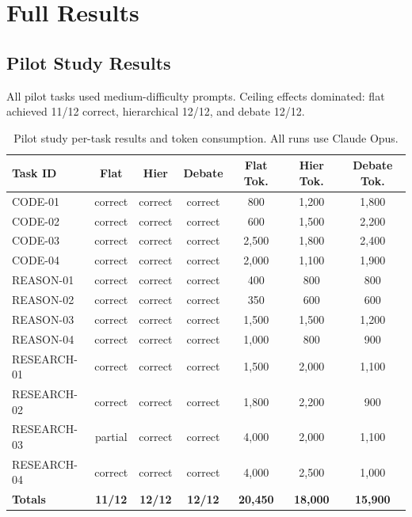 \section{Full Results}
\label{app:results}

\subsection{Pilot Study Results}

All pilot tasks used medium-difficulty prompts. Ceiling effects dominated: flat achieved 11/12 correct, hierarchical 12/12, and debate 12/12.

\begin{table}[h]
\centering
\caption{Pilot study per-task results and token consumption. All runs use Claude Opus.}
\label{tab:pilot_results}
\scriptsize
\begin{tabular}{lcccccc}
\toprule
\textbf{Task ID} & \textbf{Flat} & \textbf{Hier} & \textbf{Debate} & \textbf{Flat Tok.} & \textbf{Hier Tok.} & \textbf{Debate Tok.} \\
\midrule
CODE-01 & correct & correct & correct & 800 & 1,200 & 1,800 \\
CODE-02 & correct & correct & correct & 600 & 1,500 & 2,200 \\
CODE-03 & correct & correct & correct & 2,500 & 1,800 & 2,400 \\
CODE-04 & correct & correct & correct & 2,000 & 1,100 & 1,900 \\
REASON-01 & correct & correct & correct & 400 & 800 & 800 \\
REASON-02 & correct & correct & correct & 350 & 600 & 600 \\
REASON-03 & correct & correct & correct & 1,500 & 1,500 & 1,200 \\
REASON-04 & correct & correct & correct & 1,000 & 800 & 900 \\
RESEARCH-01 & correct & correct & correct & 1,500 & 2,000 & 1,100 \\
RESEARCH-02 & correct & correct & correct & 1,800 & 2,200 & 900 \\
RESEARCH-03 & partial & correct & correct & 4,000 & 2,000 & 1,100 \\
RESEARCH-04 & correct & correct & correct & 4,000 & 2,500 & 1,000 \\
\midrule
\textbf{Totals} & \textbf{11/12} & \textbf{12/12} & \textbf{12/12} & \textbf{20,450} & \textbf{18,000} & \textbf{15,900} \\
\bottomrule
\end{tabular}
\end{table}

